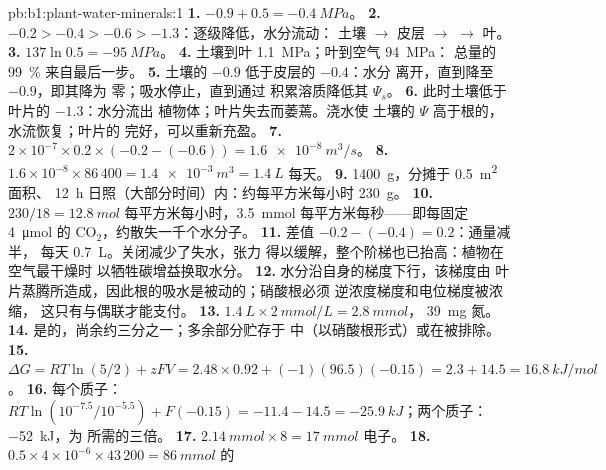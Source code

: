 \begin{solution}{pb:b1:plant-water-minerals:1}
\textbf{1.} $-0.9 + 0.5 = \qty{-0.4}{MPa}$。
\textbf{2.} $-0.2 > -0.4 > -0.6 > -1.3$：逐级降低，水分流动：
土壤 $\to$ 皮层 $\to$  $\to$ 叶。
\textbf{3.} $137\ln 0.5 = \qty{-95}{MPa}$。
\textbf{4.} 土壤到叶 \qty{1.1}{MPa}；叶到空气 \qty{94}{MPa}：
总量的 \qty{99}{\%} 来自最后一步。
\textbf{5.} 土壤的 $-0.9$ 低于皮层的 $-0.4$：水分
离开，直到降至 $-0.9$，即其降为
零；吸水停止，直到通过
积累溶质降低其 $\Psi_s$。
\textbf{6.} 此时土壤低于叶片的 $-1.3$：水分流出
植物体；叶片失去而萎蔫。浇水使
土壤的 $\Psi$ 高于根的，水流恢复；叶片的
完好，可以重新充盈。
\textbf{7.} $2\times 10^{-7}\times 0.2\times(-0.2 - (-0.6)) =
\qty{1.6e-8}{m^3/s}$。
\textbf{8.} $1.6\times 10^{-8}\times 86\,400 = \qty{1.4e-3}{m^3} =
\qty{1.4}{L}$ 每天。
\textbf{9.} \qty{1400}{g}，分摊于 \qty{0.5}{m^2} 面积、
\qty{12}{h} 日照（大部分时间）内：约每平方米每小时 \qty{230}{g}。
\textbf{10.} $230/18 = \qty{12.8}{mol}$ 每平方米每小时，\qty{3.5}{mmol} 每平方米每秒——即每固定 \qty{4}{\micro mol} 的 $\mathrm{CO_2}$，约散失一千个水分子。
\textbf{11.} 差值 $-0.2 - (-0.4) = 0.2$：通量减半，
每天 \qty{0.7}{L}。关闭减少了失水，张力
得以缓解，整个阶梯也已抬高：植物在空气最干燥时
以牺牲碳增益换取水分。
\textbf{12.} 水分沿自身的梯度下行，该梯度由
叶片蒸腾所造成，因此根的吸水是被动的；硝酸根必须
逆浓度梯度和电位梯度被浓缩，
这只有与偶联才能支付。
\textbf{13.} $\qty{1.4}{L}\times\qty{2}{mmol/L} = \qty{2.8}{mmol}$，
\qty{39}{mg} 氮。
\textbf{14.} 是的，尚余约三分之一；多余部分贮存于
中（以硝酸根形式）或在被排除。
\textbf{15.} $\Delta G = RT\ln(5/2) + zFV = 2.48\times 0.92 + (-1)(96.5)(-0.15)
= 2.3 + 14.5 = \qty{16.8}{kJ/mol}$。
\textbf{16.} 每个质子：$RT\ln(10^{-7.5}/10^{-5.5}) + F(-0.15) =
-11.4 - 14.5 = \qty{-25.9}{kJ}$；两个质子：\qty{-52}{kJ}，为
所需的三倍。
\textbf{17.} $\qty{2.14}{mmol}\times 8 = \qty{17}{mmol}$ 电子。
\textbf{18.} $0.5\times 4\times 10^{-6}\times 43\,200 = \qty{86}{mmol}$ 的

\end{solution}
